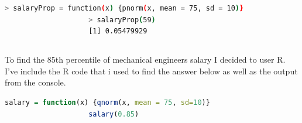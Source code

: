 \documentclass[letterpaper, onecolumn,10pt]{IEEEtran}
\begin{document}
                \begin{lstlisting}[language=sh]
                    > salaryProp = function(x) {pnorm(x, mean = 75, sd = 10)}
                    > salaryProp(59)
                    [1] 0.05479929
                \end{lstlisting}
                
            \subsection{}
                To find the 85th percentile of mechanical engineers salary I decided to user R. I've include the R code that i used to find the answer below as well as the output from the console.
                
                \begin{lstlisting}[language=R]
                    salary = function(x) {qnorm(x, mean = 75, sd=10)}
                    salary(0.85)
                \end{lstlisting}
                
\end{document}
